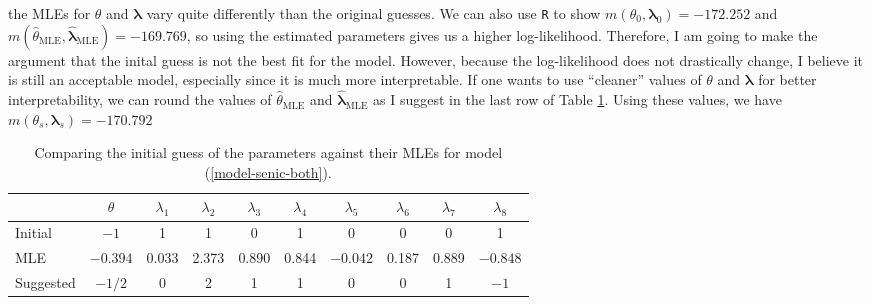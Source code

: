 \documentclass[10pt]{article}
\begin{document}
\begin{itemize}
    the MLEs for \(\theta\) and \(\bm{\lambda}\) vary quite differently than the original guesses. We can also use \texttt{R} to show \(m(\theta_0, \bm{\lambda}_0) = -172.252\)
    and \(m(\hat{\theta}_{\mathrm{MLE}}, \hat{\bm{\lambda}}_{\mathrm{MLE}}) = -169.769\), so using the estimated parameters gives us a higher log-likelihood. 
    Therefore, I am going to make the argument that the inital guess is not the best fit for the model. 
    However, because the log-likelihood does not drastically change, I believe it is still an acceptable model, especially since it is much more interpretable. 
    If one wants to use ``cleaner'' values of \(\theta\) and \(\bm{\lambda}\) for better interpretability, 
    we can round the values of \(\hat{\theta}_{\mathrm{MLE}}\) and \(\hat{\bm{\lambda}}_{\mathrm{MLE}}\) as I suggest in the last row of Table \ref{table-pars-comp}.
    Using these values, we have \(m(\theta_s, \bm{\lambda}_s) = -170.792\)
    \begin{table}[ht]
        \centering
        \def\arraystretch{1.25}
        \begin{tabular}{|l|c|cccccccc|}
            \hline%
            & \(\theta\) & \(\lambda_1\) & \(\lambda_2\) & \(\lambda_3\) & \(\lambda_4\) & \(\lambda_5\) & \(\lambda_6\) & \(\lambda_7\) & \(\lambda_8\) \\
            \hline%
            Initial & \(-1\) & 1 & 1 & 0 & 1 & 0 & 0 & 0 & 1 \\
            MLE & \(-0.394\) & 0.033 & 2.373 & 0.890 & 0.844 & \(-0.042\) & 0.187 & 0.889 & \(-0.848\) \\
            Suggested & \(-1/2\) & 0 & 2 & 1 & 1 & 0 & 0 & 1 & \(-1\) \\
            \hline%
        \end{tabular}
        \caption{Comparing the initial guess of the parameters against their MLEs for model (\ref{model-senic-both}).}
        \label{table-pars-comp}
    \end{table}


\end{itemize}
\end{document}
